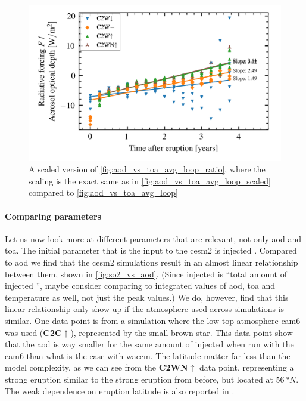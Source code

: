 \documentclass[twocol]{ametsocV5}
\newcommand{\iso}[1][i]{{#1}njected \ce{SO2}}
\begin{document}
\begin{figure}
  \begin{center}
    \includegraphics[width=0.95\linewidth]{figures/aod_vs_toa_avg_loop_ratio_scaled.png}
  \end{center}
  \caption{
    A scaled version of \cref{fig:aod_vs_toa_avg_loop_ratio}, where the scaling is the
    exact same as in \cref{fig:aod_vs_toa_avg_loop_scaled} compared to
    \cref{fig:aod_vs_toa_avg_loop}
  }%
  \label{fig:aod_vs_toa_avg_loop_ratio_scaled}
\end{figure}

\paragraph{Comparing parameters}

Let us now look more at different parameters that are relevant, not only \acrshort{aod}
and \acrshort{toa}. The initial parameter that is the input to the \acrshort{cesm2} is
injected . Compared to \acrshort{aod} we find that the \acrshort{cesm2}
simulations result in an almost linear relationship between them, shown in
\cref{fig:so2_vs_aod}. (Since \iso{} is ``total amount of \iso{}'', maybe consider
comparing to integrated values of \acrshort{aod}, \acrshort{toa} and temperature as
well, not just the peak values.) We do, however, find that this linear relationship only
show up if the atmosphere used across simulations is similar. One data point is from a
simulation where the low-top atmosphere \acrshort{cam6} was used
(\textbf{C2C\(\uparrow\)}), represented by the small brown star. This data point show
that the \acrshort{aod} is way smaller for the same amount of injected  when run
with the \acrshort{cam6} than what is the case with \acrshort{waccm}. The latitude
matter far less than the model complexity, as we can see from the
\textbf{C2WN\(\uparrow\)} data point, representing a strong eruption similar to the
strong eruption from before, but located at \( \SI{56}{\degree N} \). The weak
dependence on eruption latitude is also reported in \citet{marshall2019}.
\end{document}
